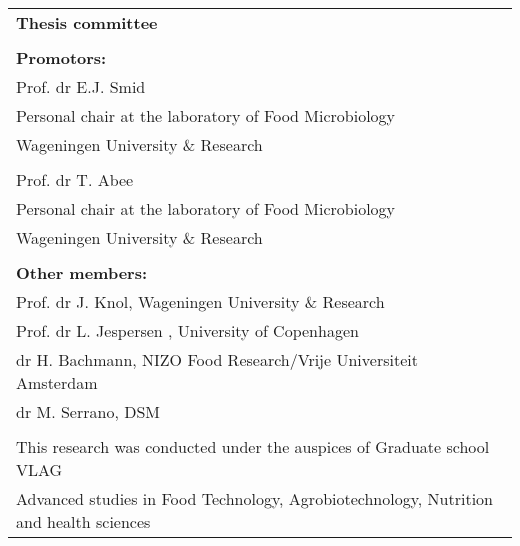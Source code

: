 \newpage
\thispagestyle{empty}
\vspace*{\fill}
\begin{tabular}{l}
    \textbf{Thesis committee}                                                                 \\  
                                                                                              \\  
    \textbf{Promotors:}                                                                        \\  
    Prof. dr E.J. Smid                                                                         \\  
    Personal chair at the laboratory of Food Microbiology                                  \\  
    Wageningen University \& Research                                                                    \\  
                                                                                                             \\  
    Prof. dr T. Abee                                                                  \\  
    Personal chair at the laboratory of Food Microbiology             \\  
    Wageningen University \& Research                                                                     \\  
                                                                                              \\  

    \textbf{Other members:}                                                                   \\  
    Prof. dr J. Knol, Wageningen University \& Research                                              \\  
    Prof. dr L. Jespersen , University of Copenhagen                                                       \\  
    dr H. Bachmann, NIZO Food Research/Vrije Universiteit Amsterdam                                                       \\  
    dr M. Serrano, DSM                                                     \\  
                                                                                              \\  

    \small{This research was conducted under the auspices of Graduate school VLAG} 		\\  
    \small{Advanced studies in Food Technology, Agrobiotechnology, Nutrition and health sciences}                         \\  
\end{tabular}

